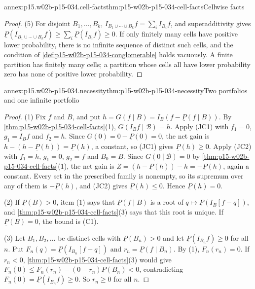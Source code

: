 \begin{annexitem}{annex:p15.w02b-p15-034.cell-facts}{thm:p15-w02b-p15-034-cell-facts}{Cellwise facts}
\begin{proof}
(5) For disjoint \(B_1,\ldots,B_k\),
\(I_{B_1\cup\cdots\cup B_k}f=\sum_iI_{B_i}f\), and superadditivity gives
\(\underline P(I_{B_1\cup\cdots\cup B_k}f)\geq\sum_i\underline P(I_{B_i}f)\geq0\).
If only finitely many cells have positive lower probability, there is no
infinite sequence of distinct such cells, and the condition of
\cref{def:p15-w02b-p15-034-conglomerable} holds vacuously. A finite partition
has finitely many cells; a partition whose cells all have lower probability
zero has none of positive lower probability.
\end{proof}
\end{annexitem}

\begin{annexitem}{annex:p15.w02b-p15-034.necessity}{thm:p15-w02b-p15-034-necessity}{Two portfolios and one infinite portfolio}
\begin{proof}
(1) Fix \(f\) and \(B\), and put \(h=G(f\mid B)=I_B(f-\underline P(f\mid B))\).
By \cref{thm:p15-w02b-p15-034-cell-facts}(1),
\(G(I_Bf\mid\mathcal B)=h\). Apply (JC1) with \(f_1=0\), \(g_1=I_Bf\) and
\(f_2=h\). Since \(G(0)=0-\underline P(0)=0\), the net gain is
\(h-(h-\underline P(h))=\underline P(h)\), a constant, so (JC1) gives
\(\underline P(h)\geq0\). Apply (JC2) with \(f_1=h\), \(g_1=0\),
\(g_2=f\) and \(B_0=B\). Since \(G(0\mid\mathcal B)=0\) by
\cref{thm:p15-w02b-p15-034-cell-facts}(1), the net gain is
\(Z=(h-\underline P(h))-h=-\underline P(h)\), again a constant. Every set
in the prescribed family is nonempty, so its supremum over any of them is
\(-\underline P(h)\), and (JC2) gives \(\underline P(h)\leq0\). Hence
\(\underline P(h)=0\).

(2) If \(\underline P(B)>0\), item (1) says that
\(\underline P(f\mid B)\) is a root of \(q\mapsto\underline P(I_B[f-q])\),
and \cref{thm:p15-w02b-p15-034-cell-facts}(3) says that this root is
unique. If \(\underline P(B)=0\), the bound is (C1).

(3) Let \(B_1,B_2,\ldots\) be distinct cells with
\(\underline P(B_n)>0\) and let \(\underline P(I_{B_n}f)\geq0\) for all
\(n\). Put \(F_n(q)=\underline P(I_{B_n}[f-q])\) and
\(r_n=\underline P(f\mid B_n)\). By (1), \(F_n(r_n)=0\). If \(r_n<0\),
\cref{thm:p15-w02b-p15-034-cell-facts}(3) would give
\(F_n(0)\leq F_n(r_n)-(0-r_n)\underline P(B_n)<0\), contradicting
\(F_n(0)=\underline P(I_{B_n}f)\geq0\). So \(r_n\geq0\) for all \(n\).


\end{proof}
\end{annexitem}
